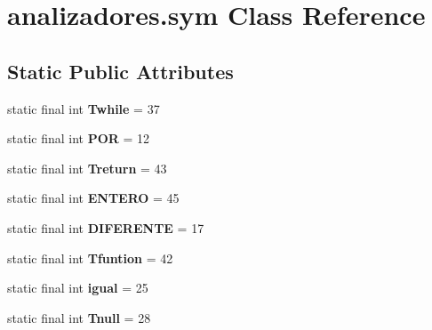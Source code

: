 \hypertarget{classanalizadores_1_1sym}{}\section{analizadores.\+sym Class Reference}
\label{classanalizadores_1_1sym}
\subsection*{Static Public Attributes}
\begin{DoxyCompactItemize}
\item 
\mbox{\label{classanalizadores_1_1sym_a2e55948a10e058c6a12f3aac3fc945a5}} 
static final int {\bfseries Twhile} = 37
\item 
\mbox{\label{classanalizadores_1_1sym_a5c4cd575e5e50f7ff2fcaf6ed368e7f6}} 
static final int {\bfseries P\+OR} = 12
\item 
\mbox{\label{classanalizadores_1_1sym_a68921c7e01dba04fa23e565b43c36c23}} 
static final int {\bfseries Treturn} = 43
\item 
\mbox{\label{classanalizadores_1_1sym_a96b7ec42662140f7a897a35542cb3da9}} 
static final int {\bfseries E\+N\+T\+E\+RO} = 45
\item 
\mbox{\label{classanalizadores_1_1sym_a73b8707a8201c36982a84acc212dd4d0}} 
static final int {\bfseries D\+I\+F\+E\+R\+E\+N\+TE} = 17
\item 
\mbox{\label{classanalizadores_1_1sym_a9322d9fdb5ed49fa3f44b4d747db07f2}} 
static final int {\bfseries Tfuntion} = 42
\item 
\mbox{\label{classanalizadores_1_1sym_a7a2f729d00cf193d2a80789183cd2167}} 
static final int {\bfseries igual} = 25
\item 
\mbox{\label{classanalizadores_1_1sym_a43fc8830ada2c457658ccf3d67c857d4}} 
static final int {\bfseries Tnull} = 28
\item 
\mbox{\label{classanalizadores_1_1sym_a5a72fe14fb56172391bfc2843764e648}} 

\end{DoxyCompactItemize}
